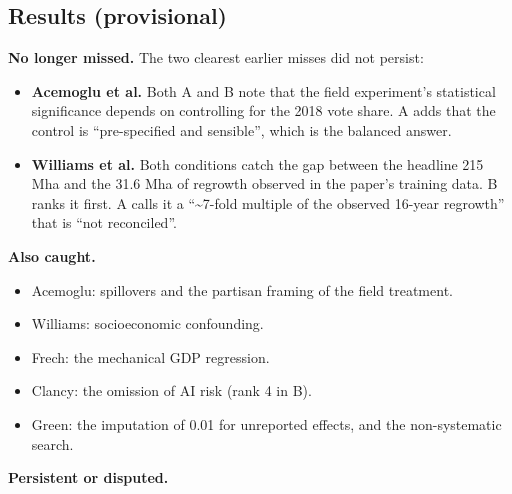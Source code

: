 \documentclass[
  11pt,
  letterpaper,
]{article}
\providecommand{\tightlist}{%
  \setlength{\itemsep}{0pt}\setlength{\parskip}{0pt}}
\begin{document}
\subsection{Results (provisional)}\label{results-provisional}

\textbf{No longer missed.} The two clearest earlier misses did not
persist:

\begin{itemize}
\tightlist
\item
  \textbf{Acemoglu et al.} Both A and B note that the field experiment's
  statistical significance depends on controlling for the 2018 vote
  share. A adds that the control is ``pre-specified and sensible'',
  which is the balanced answer.
\item
  \textbf{Williams et al.} Both conditions catch the gap between the
  headline 215 Mha and the 31.6 Mha of regrowth observed in the paper's
  training data. B ranks it first. A calls it a ``\textasciitilde7-fold
  multiple of the observed 16-year regrowth'' that is ``not
  reconciled''.
\end{itemize}

\textbf{Also caught.}

\begin{itemize}
\tightlist
\item
  Acemoglu: spillovers and the partisan framing of the field treatment.
\item
  Williams: socioeconomic confounding.
\item
  Frech: the mechanical GDP regression.
\item
  Clancy: the omission of AI risk (rank 4 in B).
\item
  Green: the imputation of 0.01 for unreported effects, and the
  non-systematic search.
\end{itemize}

\textbf{Persistent or disputed.}
\end{document}
